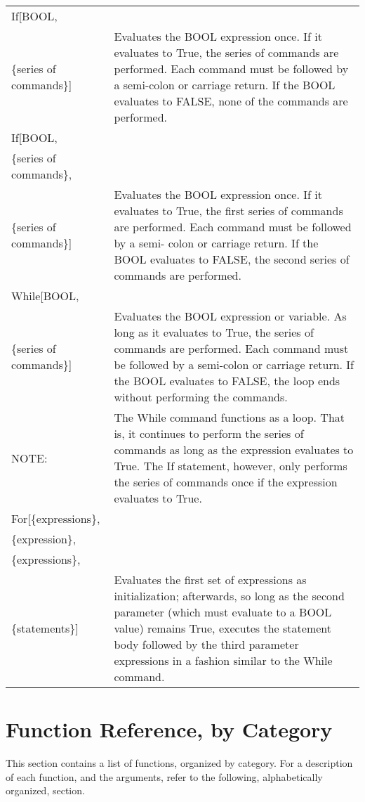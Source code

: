 \medskip

\begin{tabular}{lp{4in}}
If[BOOL, & \\
\{series of commands\}] & Evaluates the BOOL expression
once. If it evaluates to True, the series of commands are performed.
Each command must be followed by a semi-colon or carriage return.  If
the BOOL evaluates to FALSE, none of the commands are performed.\\
If[BOOL, & \\
\{series of commands\}, & \\
\{series of commands\}] & Evaluates the BOOL expression
once. If it evaluates to True, the first series of commands are
performed.  Each command must be followed by a semi- colon or carriage
return.  If the BOOL evaluates to FALSE, the second series of
commands are performed. \\
While[BOOL, &\\
\{series of commands\}] & Evaluates the BOOL
expression or variable.  As long as it evaluates to True, the series
of commands are performed.  Each command must be followed by a
semi-colon or carriage return.  If the BOOL evaluates to FALSE, the
loop ends without performing the commands.\\
NOTE: & The While command functions as a
loop.  That is, it continues to perform the series of commands as long
as the expression evaluates to True.  The If statement, however, only
performs the series of commands once if the expression evaluates to
True.\\
For[\{expressions\}, & \\
\{expression\}, & \\
\{expressions\}, & \\
\{statements\}] & Evaluates the first set of expressions as initialization;
afterwards, so long as the second parameter (which must evaluate to a 
BOOL value) remains True, executes the statement body followed by the
third parameter expressions in a fashion similar to the While command.
\end{tabular}

\section{Function Reference, by Category}

This section contains a list of functions, organized by
category.  For a description of each function, and the arguments,
refer to the following, alphabetically organized, section.

